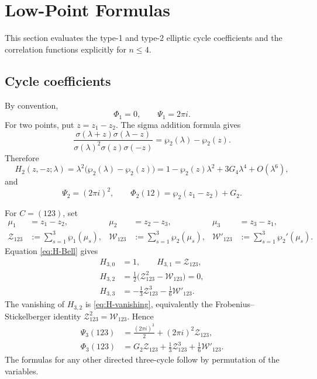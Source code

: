 \documentclass[11pt,a4paper]{amsart}
\numberwithin{equation}{section}
\theoremstyle{definition}
\theoremstyle{remark}
\newcommand{\ii}{i}
\begin{document}
\section{Low-Point Formulas}
\label{sec:low-points}

This section evaluates the type-1 and type-2 elliptic cycle coefficients and the correlation functions explicitly for $n\leq 4$.

\subsection{Cycle coefficients}
By convention,
\begin{equation*}
 \Phi_1=0,\qquad \Psi_1=2\pi\ii.
\end{equation*}
For two points, put $z=z_1-z_2$.  The sigma addition formula gives
\begin{equation*}
 \frac{\sigma(\lambda+z)\sigma(\lambda-z)}
 {\sigma(\lambda)^2\sigma(z)\sigma(-z)}
 =\wp_2(\lambda)-\wp_2(z).
\end{equation*}
Therefore
\begin{equation*}
 H_2(z,-z;\lambda)
 =\lambda^2\bigl(\wp_2(\lambda)-\wp_2(z)\bigr)
 =1-\wp_2(z)\lambda^2+3G_4\lambda^4+O(\lambda^6),
\end{equation*}
and
\begin{equation}
\Psi_2=(2\pi\ii)^2,\qquad
 \Phi_2(12)=\wp_2(z_1-z_2)+G_2.
 \label{eq:explicit-two-kernels}
\end{equation}

For $C=(123)$, set
\begin{align*}
 \mu_1&=z_1-z_2,&
 \mu_2&=z_2-z_3,&
 \mu_3&=z_3-z_1,\\
 \mathcal Z_{123}&:=\sum_{s=1}^3\wp_1(\mu_s),&
 \mathcal W_{123}&:=\sum_{s=1}^3\wp_2(\mu_s),&
 \mathcal W'_{123}&:=\sum_{s=1}^3\wp_2'(\mu_s).
\end{align*}
Equation \eqref{eq:H-Bell} gives
\begin{align*}
 H_{3,0}&=1,\qquad
 H_{3,1}=\mathcal Z_{123},\\
 H_{3,2}&=\frac12
 \bigl(\mathcal Z_{123}^2-\mathcal W_{123}\bigr)=0,\\
 H_{3,3}&=-\frac13\mathcal Z_{123}^3
 -\frac16\mathcal W'_{123}.
\end{align*}
The vanishing of $H_{3,2}$ is \eqref{eq:H-vanishing}, equivalently the
Frobenius--Stickelberger identity
$\mathcal Z_{123}^2=\mathcal W_{123}$.  Hence
\begin{align}
 \Psi_3(123)
 &=\frac{(2\pi\ii)^3}{2}
 +(2\pi\ii)^2\mathcal Z_{123},
 \label{eq:Psi3}\\
 \Phi_3(123)
 &=G_2\mathcal Z_{123}
 +\frac13\mathcal Z_{123}^3
 +\frac16\mathcal W'_{123}.
 \label{eq:Phi3}
\end{align}
The formulas for any other directed three-cycle follow by permutation of
the variables.
\end{document}

